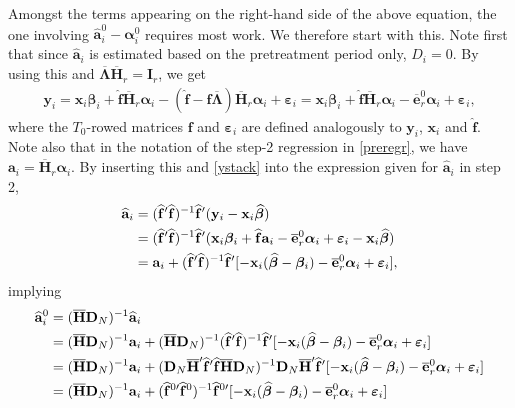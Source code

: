 \documentclass[12pt,fleqn]{article}
\def\*#1{\mathbf{#1}}
\def\+#1{\boldsymbol{#1}}
\begin{document}
Amongst the terms appearing on the right-hand side of the above equation, the one involving $\widehat{\*a}_i^0 - \+\alpha_i^0$ requires most work. We therefore start with this. Note first that since $\widehat{\*a}_i$ is estimated based on the pretreatment period only, $D_i = 0$. By using this and $\overline{\+\Lambda}\overline{\*H}_{r} = \*I_{r}$, we get
\begin{eqnarray}
\*y_{i}= \*x_{i}\+\beta_i + \widehat{\*f}\overline{\*H}_{r}\+\alpha_i - (\widehat{\*f} - \*f\overline{\+\Lambda})\overline{\*H}_{r}\+\alpha_i+  \+\varepsilon_{i}  = \*x_{i}\+\beta_i + \widehat{\*f} \overline{\*H}_{r}\+\alpha_i - \overline{\*e}_{r}^0\+\alpha_i +  \+\varepsilon_{i}, \label{ystack}
\end{eqnarray}
where the $T_0$-rowed matrices $\*f$ and $\+\varepsilon_{i}$ are defined analogously to $\*y_{i}$, $\*x_{i}$ and $\widehat{\*f}$. Note also that in the notation of the step-2 regression in \eqref{preregr}, we have $\*a_i = \overline{\*H}_{r}\+\alpha_i$. By inserting this and \eqref{ystack} into the expression given for $\widehat{\*a}_i$ in step 2,
\begin{align}
\widehat{\*a}_i &= (\widehat{\*f}'\widehat{\*f})^{-1}\widehat{\*f}'(\*y_{i}-\*x_{i}\widehat{\+\beta}) \notag\\
& = (\widehat{\*f}'\widehat{\*f})^{-1}\widehat{\*f}'(\*x_{i}\+\beta_i + \widehat{\*f} \*a_i - \overline{\*e}_{r}^0\+\alpha_i +  \+\varepsilon_{i}-\*x_{i}\widehat{\+\beta}) \notag\\
& =  \*a_i + (\widehat{\*f}'\widehat{\*f})^{-1}\widehat{\*f}'[- \*x_{i}(\widehat{\+\beta}-\+\beta_i)  - \overline{\*e}_{r}^0\+\alpha_i +  \+\varepsilon_{i} ],
\end{align}
implying
\begin{align}
\widehat{\*a}_i^0 & = (\overline{\*{H}}\*{D}_N)^{-1}\widehat{\*a}_i \notag\\
& = (\overline{\*{H}}\*{D}_N)^{-1}\*a_i + (\overline{\*{H}}\*{D}_N)^{-1}(\widehat{\*f}'\widehat{\*f})^{-1}\widehat{\*f}'[- \*x_{i}(\widehat{\+\beta}-\+\beta_i) - \overline{\*e}_{r}^0\+\alpha_i +  \+\varepsilon_{i} ] \notag\\
& = (\overline{\*{H}}\*{D}_N)^{-1}\*a_i +  (
\*{D}_N\overline{\*{H}}'\widehat{\*f}'\widehat{\*f}\overline{\*{H}}\*{D}_N)^{-1}\*{D}_N\overline{\*{H}}'\widehat{\*f}' [ - \*x_{i}(\widehat{\+\beta}-\+\beta_i)  - \overline{\*e}_{r}^0\+\alpha_i +  \+\varepsilon_{i}]
\notag\\
& = (\overline{\*{H}}\*{D}_N)^{-1}\*a_i + (\widehat{\*f}^{0\prime}\widehat{\*f}^0)^{-1}\widehat{\*f}^{0\prime}[- \*x_{i}(\widehat{\+\beta}-\+\beta_i)  - \overline{\*e}_{r}^0\+\alpha_i +  \+\varepsilon_{i} ]
\end{align}
\end{document}
